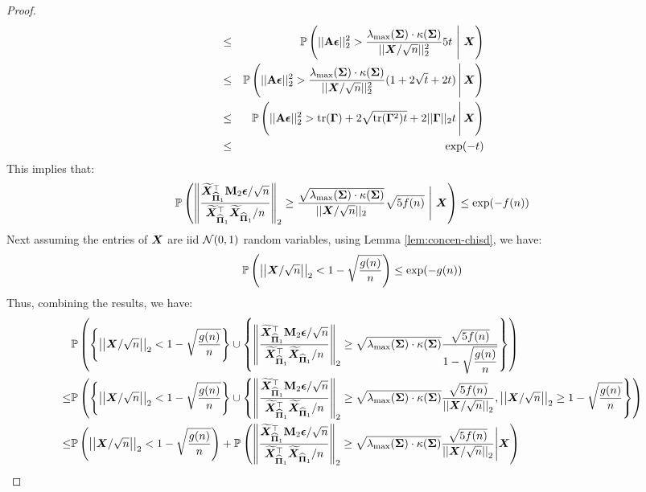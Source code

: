 \documentclass[numsec,webpdf,modern,medium,namedate]{oup-authoring-template}
\theoremstyle{thmstyleone}%
\theoremstyle{thmstyletwo}%
\theoremstyle{thmstylethree}%
\begin{document}
\begin{proof}
{\begin{eqnarray*}
         & \leq  & \pr\left(||\bA\beps||^2_2> \dfrac{\lambda_{\max}(\bSig)\cdot\kappa(\bSig)}{||\bX/\sqrt{n}||^2_2}5t\ \Bigg|\ \bX\right)\\
        & \leq & \pr\left(||\bA\beps||^2_2> \dfrac{\lambda_{\max}(\bSig)\cdot\kappa(\bSig)}{||\bX/\sqrt{n}||^2_2}(1 + 2\sqrt{t} + 2t)\, \Bigg|\, \bX\right)\\
        & \leq & \pr\left(||\bA\beps||^2_2> \tr(\bGam) + 2\sqrt{\tr(\bGam^2)t} + 2||\bGam||_2t\,\Bigg|\,\bX\right)\\
        & \leq & \exp(-t)
    \end{eqnarray*}}
    This implies that:
    {\footnotesize
    $$
\Prob\left(\norm{\frac{\widetilde{\bX}_{\hatPi_1}^\top \bM_2 \beps/\sqrt{n}}{\widetilde{\bX}_{\hatPi_1}^\top  \widetilde{\bX}_{\hatPi_1}/n}}_2\geq \dfrac{\sqrt{\lambda_{\max}(\bSig)\cdot\kappa(\bSig)}}{||\bX/\sqrt{n}||_2}\sqrt{5f(n)}\ \Bigg|\ \bX\right) \leq \exp(-f(n))
    $$}
Next assuming the entries of $\bX$ are iid $\calN(0,1)$ random variables, using Lemma \ref{lem:concen-chisd}, we have:
{\footnotesize
$$
\pr\left(\left|\left|\bX/\sqrt
        n\right|\right|_2< 1 - \sqrt{\dfrac{g(n)}{n}}\right) \leq \exp(-g(n))
$$}
Thus, combining the results, we have:
{
\scriptsize
$$
\begin{aligned}
    & \pr\left(\left\{\left|\left|\bX/\sqrt
        n\right|\right|_2< 1 - \sqrt{\dfrac{g(n)}{n}}\right\}\cup\left\{\norm{\frac{\widetilde{\bX}_{\hatPi_1}^\top \bM_2 \beps/\sqrt{n}}{\widetilde{\bX}_{\hatPi_1}^\top  \widetilde{\bX}_{\hatPi_1}/n}}_2\geq \sqrt{\lambda_{\max}(\bSig)\cdot\kappa(\bSig)}\dfrac{\sqrt{5f(n)}}{1 - \sqrt{\dfrac{g(n)}{n}}}\right\}\right)\\
        \leq & \pr\left(\left\{\left|\left|\bX/\sqrt
        n\right|\right|_2< 1 - \sqrt{\dfrac{g(n)}{n}}\right\}\cup\left\{\norm{\frac{\widetilde{\bX}_{\hatPi_1}^\top \bM_2 \beps/\sqrt{n}}{\widetilde{\bX}_{\hatPi_1}^\top  \widetilde{\bX}_{\hatPi_1}/n}}_2\geq \sqrt{\lambda_{\max}(\bSig)\cdot\kappa(\bSig)}\dfrac{\sqrt{5f(n)}}{\left|\left|\bX/\sqrt
        n\right|\right|_2},\left|\left|\bX/\sqrt
        n\right|\right|_2\geq  1 - \sqrt{\dfrac{g(n)}{n}}\right\}\right)\\
        \leq & \pr\left(\left|\left|\bX/\sqrt
        n\right|\right|_2< 1 - \sqrt{\dfrac{g(n)}{n}}\right) + \pr\left(\norm{\frac{\widetilde{\bX}_{\hatPi_1}^\top \bM_2 \beps/\sqrt{n}}{\widetilde{\bX}_{\hatPi_1}^\top  \widetilde{\bX}_{\hatPi_1}/n}}_2\geq \sqrt{\lambda_{\max}(\bSig)\cdot\kappa(\bSig)}\dfrac{\sqrt{5f(n)}}{\left|\left|\bX/\sqrt
        n\right|\right|_2}\Bigg| \bX\right)\\

\end{aligned}$$}
\end{proof}
\end{document}
